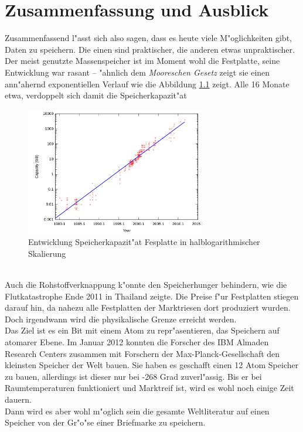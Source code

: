 
\chapter{Zusammenfassung und Ausblick}
\label{ch:Zusammenfassung}
Zusammenfassend l"asst sich also sagen, dass es heute viele M"oglichkeiten gibt, Daten zu speichern. Die einen sind praktischer, die anderen etwas unpraktischer.
Der meist genutzte Massenspeicher ist im Moment wohl die Festplatte, seine Entwicklung war rasant – "ahnlich dem \textit{Mooreschen Gesetz} zeigt sie einen ann"ahernd exponentiellen Verlauf wie die Abbildung \ref{fig:kapazit} zeigt. Alle 16 Monate etwa, verdoppelt sich damit die Speicherkapazit"at
\begin{figure}[ht]
				\centering
				\includegraphics[width=0.7\textwidth]{images/kapazit} 
				\caption[Entwicklung Speicherkapazit"at Fesplatte in halblogarithmischer Skalierung \cite{fig:kapazit}]{Entwicklung Speicherkapazit"at Fesplatte in halblogarithmischer Skalierung}
				\label{fig:kapazit}
				\end{figure}
\\
Auch die Rohstoffverknappung k"onnte den Speicherhunger behindern, wie die Flutkatastrophe Ende 2011 in Thailand zeigte. Die Preise f"ur Festplatten stiegen darauf hin, da nahezu alle Festplatten der Marktriesen dort produziert wurden.
\\
Doch irgendwann wird die physikalische Grenze erreicht werden.
\\
Das Ziel ist es ein Bit mit einem Atom zu repr"asentieren, das Speichern auf atomarer Ebene. Im Januar 2012 konnten die Forscher des IBM Almaden Research Centers zusammen mit Forschern der Max-Planck-Gesellschaft den kleinsten Speicher der Welt bauen. Sie haben es geschafft einen 12 Atom Speicher zu bauen, allerdings ist dieser nur bei -268 Grad zuverl"assig. Bis er bei Raumtemperaturen funktioniert und Marktreif ist, wird es wohl noch einige Zeit dauern.\cite{heise:ibm} 
\\
Dann wird es aber wohl m"oglich sein die gesamte Weltliteratur auf einen Speicher von der Gr"o"se einer Briefmarke zu speichern. 

